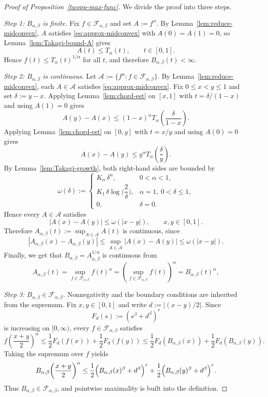 \documentclass[11pt]{amsart}
\theoremstyle{definition}
\renewcommand{\1}{{\mathbbm{1}}}
\begin{document}
\begin{proof}[Proof of Proposition~\ref{twopp-max-func}]
We divide the proof into three steps.

\smallskip
\noindent\textit{Step 1: $B_{\alpha,\beta}$ is finite.}
Fix $f\in\mathcal F_{\alpha,\beta}$ and set $A:=f^\alpha$. By
Lemma~\ref{lem:reduce-midconvex}, $A$ satisfies \eqref{eq:approx-midconvex}
with $A(0)=A(1)=0$, so Lemma~\ref{lem:Takagi-bound-A} gives
\[
A(t)\le T_\alpha(t),\qquad t\in[0,1].
\]
Hence $f(t)\le T_\alpha(t)^{1/\alpha}$ for all $t$, and therefore
$B_{\alpha,\beta}(t)<\infty$.

\smallskip
\noindent\textit{Step 2: $B_{\alpha,\beta}$ is continuous.}
Let $\mathcal A:=\{f^\alpha:f\in\mathcal F_{\alpha,\beta}\}$. By
Lemma~\ref{lem:reduce-midconvex}, each $A\in\mathcal A$ satisfies
\eqref{eq:approx-midconvex}. Fix $0\le x<y\le1$ and set $\delta:=y-x$.
Applying Lemma~\ref{lem:chord-est} on $[x,1]$ with $t=\delta/(1-x)$ and using
$A(1)=0$ gives
\[
A(y)-A(x)\le (1-x)^\alpha T_\alpha\!\left(\frac{\delta}{1-x}\right).
\]
Applying Lemma~\ref{lem:chord-est} on $[0,y]$ with $t=x/y$ and using $A(0)=0$
gives
\[
A(x)-A(y)\le y^\alpha T_\alpha\!\left(\frac{\delta}{y}\right).
\]
By Lemma~\ref{lem:Takagi-growth}, both right-hand sides are bounded by
\[
\omega(\delta):=
\begin{cases}
K_\alpha\,\delta^\alpha, & 0<\alpha<1,\\[2mm]
K_1\,\delta\log\!\bigl(\dfrac{2}{\delta}\bigr), & \alpha=1,\ 0<\delta\le1,\\[2mm]
0, & \delta=0.
\end{cases}
\]
Hence every $A\in\mathcal A$ satisfies
\[
|A(x)-A(y)|\le \omega(|x-y|),
\qquad x,y\in[0,1].
\]
Therefore
$
A_{\alpha,\beta}(t):=\sup_{A\in\mathcal A}A(t)
$
is continuous, since
\[
|A_{\alpha,\beta}(x)-A_{\alpha,\beta}(y)|
\le
\sup_{A\in\mathcal A}|A(x)-A(y)|
\le
\omega(|x-y|).
\]
Finally, we get that $B_{\alpha,\beta}=A_{\alpha,\beta}^{1/\alpha}$ is continuous from
\[
A_{\alpha,\beta}(t)
=
\sup_{f\in\mathcal F_{\alpha,\beta}} f(t)^\alpha
=
\left(\sup_{f\in\mathcal F_{\alpha,\beta}}f(t)\right)^\alpha
=
B_{\alpha,\beta}(t)^\alpha,
\]


\smallskip
\noindent\textit{Step 3: $B_{\alpha,\beta}\in\mathcal F_{\alpha,\beta}$.}
Nonnegativity and the boundary conditions are inherited from the supremum. Fix
$x,y\in[0,1]$ and write $d:=|(x-y)/2|$. Since
\[
F_d(s):=(s^\beta+d^\beta)^r
\]
is increasing on $[0,\infty)$, every $f\in\mathcal F_{\alpha,\beta}$ satisfies
\[
f\!\left(\frac{x+y}{2}\right)^\alpha
\le
\frac12 F_d(f(x))+\frac12 F_d(f(y))
\le
\frac12 F_d(B_{\alpha,\beta}(x))+\frac12 F_d(B_{\alpha,\beta}(y)).
\]
Taking the supremum over $f$ yields
\[
B_{\alpha,\beta}\!\left(\frac{x+y}{2}\right)^\alpha
\le
\frac12\Bigl(B_{\alpha,\beta}(x)^\beta+d^\beta\Bigr)^r
+
\frac12\Bigl(B_{\alpha,\beta}(y)^\beta+d^\beta\Bigr)^r.
\]
Thus $B_{\alpha,\beta}\in\mathcal F_{\alpha,\beta}$, and pointwise maximality is
built into the definition.
\end{proof}
\end{document}
